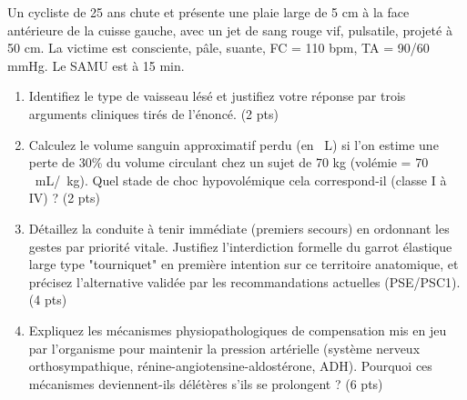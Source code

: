 \documentclass[11pt]{article}
\begin{document}
\begin{exercice}
\label{exo:hemo}
Un cycliste de 25 ans chute et présente une plaie large de 5 cm à la face antérieure de la cuisse gauche, avec un jet de sang rouge vif, pulsatile, projeté à 50 cm. La victime est consciente, pâle, suante, FC = 110 bpm, TA = 90/60 mmHg. Le SAMU est à 15 min.
\begin{enumerate}
    \item Identifiez le type de vaisseau lésé et justifiez votre réponse par trois arguments cliniques tirés de l'énoncé. (2 pts)
    \item Calculez le volume sanguin approximatif perdu (en \SI{}{\liter}) si l'on estime une perte de 30\% du volume circulant chez un sujet de 70 kg (volémie = 70 \SI{}{\milli\liter}/\SI{}{\kilo\gram}). Quel stade de choc hypovolémique cela correspond-il (classe I à IV) ? (2 pts)
    \item Détaillez la conduite à tenir immédiate (premiers secours) en ordonnant les gestes par priorité vitale. Justifiez l'interdiction formelle du garrot élastique large type "tourniquet" en première intention sur ce territoire anatomique, et précisez l'alternative validée par les recommandations actuelles (PSE/PSC1). (4 pts)
    \item Expliquez les mécanismes physiopathologiques de compensation mis en jeu par l'organisme pour maintenir la pression artérielle (système nerveux orthosympathique, rénine-angiotensine-aldostérone, ADH). Pourquoi ces mécanismes deviennent-ils délétères s'ils se prolongent ? (6 pts)
\end{enumerate}
\end{exercice}
\end{document}

